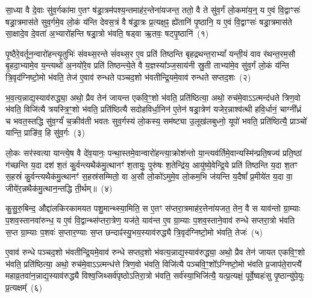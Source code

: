 \setcounter{anuvakam}{0}
सा॒ध्या वै दे॒वाः सु॑व॒र्गका॑मा ए॒तꣳ ष॑ड्रा॒त्रम॑पश्य॒न्तमाह॑र॒न्तेना॑यजन्त॒ ततो॒ वै ते सु॑व॒र्गं लो॒कमा॑य॒न्॒ य ए॒वं वि॒द्वाꣳसः॑ षड्रा॒त्रमास॑ते सुव॒र्गमे॒व लो॒कं य॑न्ति देवस॒त्रं वै ष॑ड्रा॒त्रः प्र॒त्यक्ष॒ꣴ॒ ह्ये॑तानि॑ पृ॒ष्ठानि॒ य ए॒वं वि॒द्वाꣳसः॑ षड्रा॒त्रमास॑ते सा॒क्षादे॒व दे॒वता॑ अ॒भ्यारो॑हन्ति षड्रा॒त्रो भ॑वति॒ षड्वा ऋ॒तवः॒ षट्पृ॒ष्ठानि॑~(१)\ip

पृ॒ष्ठैरे॒वर्तून॒न्वारो॑हन्त्यृ॒तुभिः॑ संवथ्स॒रन्ते सं॑वथ्स॒र ए॒व प्रति॑ तिष्ठन्ति बृहद्रथन्त॒रा\-भ्यां᳚ यन्ती॒यं वाव र॑थन्त॒रम॒सौ बृ॒हदा॒भ्यामे॒व य॒न्त्यथो॑ अ॒नयो॑रे॒व प्रति॑ तिष्ठन्त्ये॒ते वै य॒ज्ञस्या᳚ञ्ज॒साय॑नी स्रु॒ती ताभ्या॑मे॒व सु॑व॒र्गं लो॒कं य॑न्ति त्रि॒वृद॑ग्निष्टो॒मो भ॑वति॒ तेज॑ ए॒वाव॑ रुन्धते पञ्चद॒शो भ॑वतीन्द्रि॒यमे॒वाव॑ रुन्धते सप्तद॒शः~(२)\ip

भ॒व॒त्य॒न्नाद्य॒स्याव॑रुद्ध्या॒ अथो॒ प्रैव तेन॑ जायन्त एकवि॒ꣳ॒शो भ॑वति॒ प्रति॑ष्ठित्या॒ अथो॒ रुच॑मे॒वा\-ऽऽ\-त्मन्द॑धते त्रिण॒वो भ॑वति॒ विजि॑त्यै त्रयस्त्रि॒ꣳ॒शो भ॑वति॒ प्रति॑ष्ठित्यै सदोहविर्धा॒निन॑ ए॒तेन॑ षड्रा॒त्रेण॑ यजेर॒न्नाश्व॑त्थी हवि॒र्धानं॒ चाग्नी᳚ध्रं च भवत॒स्तद्धि सु॑व॒र्ग्यं॑ च॒क्रीव॑ती भवतः सुव॒र्गस्य॑ लो॒कस्य॒ सम॑ष्ट्या उ॒लूख॑लबुध्नो॒ यूपो॑ भवति॒ प्रति॑ष्ठित्यै॒ प्राञ्चो॑ यान्ति॒ प्राङि॑व॒ हि सु॑व॒र्गः~(३)\ip

लो॒कः सर॑स्वत्या यान्त्ये॒ष वै दे॑व॒यानः॒ पन्था॒स्तमे॒वान्वारो॑हन्त्या॒क्रोश॑न्तो या॒न्त्यव॑र्तिमे॒वान्यस्मि॑न्प्रति॒षज्य॑ प्रति॒ष्ठां ग॑च्छन्ति य॒दा दश॑ श॒तं कु॒र्वन्त्यथैक॑मु॒त्थानꣳ॑ श॒तायुः॒ पुरु॑षः श॒तेन्द्रि॑य॒ आयु॑ष्ये॒वेन्द्रि॒ये प्रति॑ तिष्ठन्ति य॒दा श॒तꣳ स॒हस्रं॑ कु॒र्वन्त्यथैक॑मु॒त्थानꣳ॑ स॒हस्र॑सम्मितो॒ वा अ॒सौ लो॒को॑\-ऽमुमे॒व लो॒कम॒भि ज॑यन्ति य॒दैषां᳚ प्र॒मीये॑त य॒दा वा॒ जीये॑र॒न्नथैक॑मु॒त्थान॒न्तद्धि ती॒र्थम्॥~(४)\ip

{\anuvakamend[{पृ॒ष्ठानि॑ सप्तद॒शः सु॑व॒र्गो ज॑यन्ति य॒दैका॑\-दश च}]}

कु॒सु॒रु॒बिन्द॒ औद्दा॑लकिरकामयत पशु॒मान्थ्स्या॒मिति॒ स ए॒तꣳ स॑प्तरा॒त्रमाह॑र॒त्तेना॑यजत॒ तेन॒ वै स याव॑न्तो ग्रा॒म्याः प॒शव॒स्तानवा॑रुन्ध॒ य ए॒वं वि॒द्वान्थ्स॑प्तरा॒त्रेण॒ यज॑ते॒ याव॑न्त ए॒व ग्रा॒म्याः प॒शव॒स्ताने॒वाव॑ रुन्धे सप्तरा॒त्रो भ॑वति स॒प्त ग्रा॒म्याः प॒शवः॑ स॒प्तार॒ण्याः स॒प्त छन्दाꣴ॑स्यु॒भय॒स्याव॑रुद्ध्यै त्रि॒वृद॑ग्निष्टो॒मो भ॑वति॒ तेजः॑~(५)\ip

ए॒वाव॑ रुन्धे पञ्चद॒शो भ॑वतीन्द्रि॒यमे॒वाव॑ रुन्धे सप्तद॒शो भ॑वत्य॒न्नाद्य॒स्याव॑रुद्ध्या॒ अथो॒ प्रैव तेन॑ जायत एकवि॒ꣳ॒शो भ॑वति॒ प्रति॑ष्ठित्या॒ अथो॒ रुच॑मे॒वा\-ऽऽ\-त्मन्ध॑त्ते त्रिण॒वो भ॑वति॒ विजि॑त्यै पञ्चवि॒ꣳ॒शो᳚\-ऽग्निष्टो॒मो भ॑वति प्र॒जा\-प॑ते॒राप्त्यै॑ महाव्र॒तवा॑न॒न्नाद्य॒स्याव॑रुद्ध्यै विश्व॒जिथ्सर्व॑पृष्ठो\-ऽतिरा॒त्रो भ॑वति॒ सर्व॑स्या॒भिजि॑त्यै॒ यत्प्र॒त्यक्षं॒ पूर्वे॒ष्वहः॑सु पृ॒ष्ठान्यु॑पे॒युः प्र॒त्यक्षम्᳚~(६)\ip

